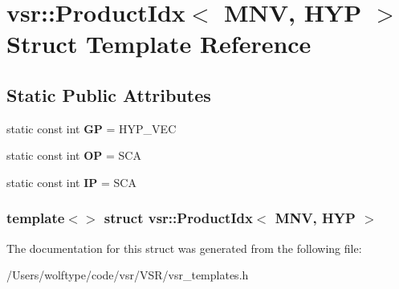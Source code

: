 \hypertarget{structvsr_1_1_product_idx_3_01_m_n_v_00_01_h_y_p_01_4}{\section{vsr\-:\-:Product\-Idx$<$ M\-N\-V, H\-Y\-P $>$ Struct Template Reference}
\label{structvsr_1_1_product_idx_3_01_m_n_v_00_01_h_y_p_01_4}
}
\subsection*{Static Public Attributes}
\begin{DoxyCompactItemize}
\item 
\hypertarget{structvsr_1_1_product_idx_3_01_m_n_v_00_01_h_y_p_01_4_a30671f2fae50a1f54cbfafdc730da212}{static const int {\bfseries G\-P} = H\-Y\-P\-\_\-\-V\-E\-C}\label{structvsr_1_1_product_idx_3_01_m_n_v_00_01_h_y_p_01_4_a30671f2fae50a1f54cbfafdc730da212}

\item 
\hypertarget{structvsr_1_1_product_idx_3_01_m_n_v_00_01_h_y_p_01_4_ae994718510c979a103b8a3d32df8a356}{static const int {\bfseries O\-P} = S\-C\-A}\label{structvsr_1_1_product_idx_3_01_m_n_v_00_01_h_y_p_01_4_ae994718510c979a103b8a3d32df8a356}

\item 
\hypertarget{structvsr_1_1_product_idx_3_01_m_n_v_00_01_h_y_p_01_4_a898dd278985cbf1266f7f37a0df3f864}{static const int {\bfseries I\-P} = S\-C\-A}\label{structvsr_1_1_product_idx_3_01_m_n_v_00_01_h_y_p_01_4_a898dd278985cbf1266f7f37a0df3f864}

\end{DoxyCompactItemize}
\subsubsection*{template$<$$>$ struct vsr\-::\-Product\-Idx$<$ M\-N\-V, H\-Y\-P $>$}



The documentation for this struct was generated from the following file\-:\begin{DoxyCompactItemize}
\item 
/\-Users/wolftype/code/vsr/\-V\-S\-R/vsr\-\_\-templates.\-h\end{DoxyCompactItemize}
